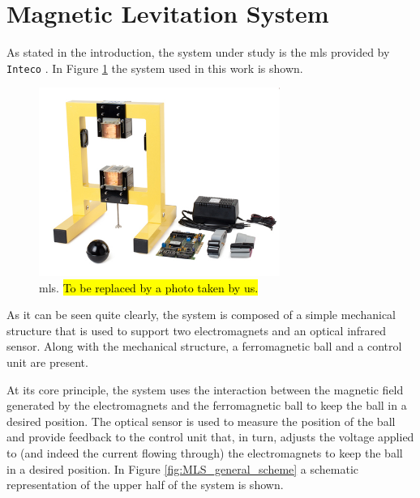 \section{Magnetic Levitation System}
\label{sec:magnetic_levitation_system}

As stated in the introduction, the system under study is the \acrfull{mls} provided by \texttt{Inteco} \cite{IntecoMLS}.
In Figure \ref{fig:MLS} the system used in this work is shown.

\begin{figure}[H]
    \centering
    \includegraphics[width=0.7\textwidth]{./img/magLev_and_components.jpg}
    \caption{\acrlong{mls}. \hl{To be replaced by a photo taken by us.}}
    \label{fig:MLS}
\end{figure}

As it can be seen quite clearly, the system is composed of a simple mechanical structure that is used to support two electromagnets and an optical infrared sensor.
Along with the mechanical structure, a ferromagnetic ball and a control unit are present.

At its core principle, the system uses the interaction between the magnetic field generated by the electromagnets and the ferromagnetic ball to keep the ball in a desired position.
The optical sensor is used to measure the position of the ball and provide feedback to the control unit that, in turn, adjusts the voltage applied to (and indeed the current flowing through) the electromagnets to keep the ball in a desired position.
In Figure \ref{fig:MLS_general_scheme} a schematic representation of the upper half of the system is shown.

